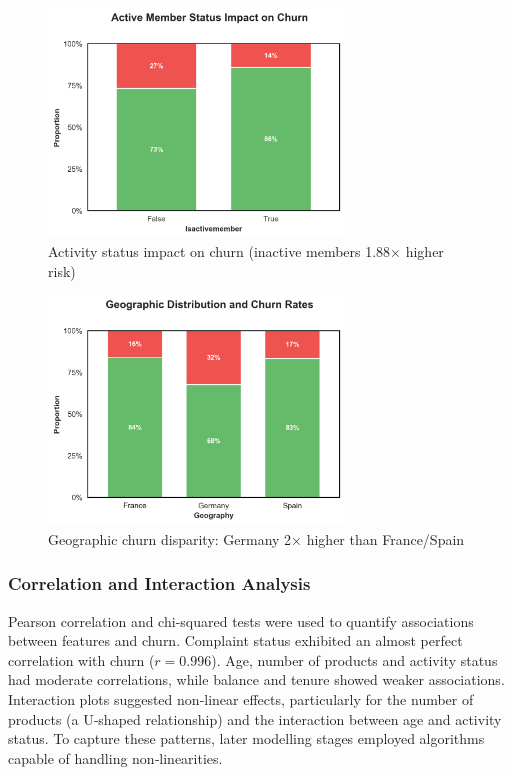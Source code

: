 \documentclass[12pt]{article}
\begin{document}
\begin{figure}[H]
\centering
\includegraphics[width=0.7\textwidth]{img/05_active_member_impact.png}
\caption{Activity status impact on churn (inactive members 1.88× higher risk)}
\label{fig:active}
\end{figure}

\begin{figure}[H]
\centering
\includegraphics[width=0.7\textwidth]{img/06_geography_churn.png}
\caption{Geographic churn disparity: Germany 2× higher than France/Spain}
\label{fig:geography}
\end{figure}

\subsubsection{Correlation and Interaction Analysis}
Pearson correlation and chi‑squared tests were used to quantify associations between features and churn.  Complaint status exhibited an almost perfect correlation with churn (\(r=0.996\)).  Age, number of products and activity status had moderate correlations, while balance and tenure showed weaker associations.  Interaction plots suggested non‑linear effects, particularly for the number of products (a U‑shaped relationship) and the interaction between age and activity status.  To capture these patterns, later modelling stages employed algorithms capable of handling non‑linearities.
\end{document}
